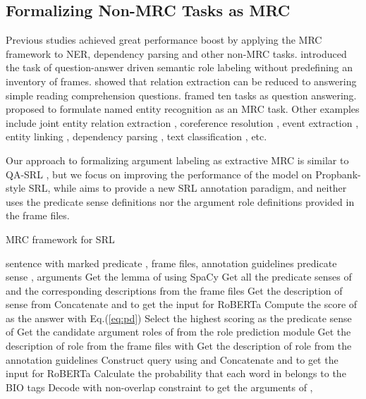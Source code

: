 \documentclass[11pt]{article}
\begin{document}
\subsection{Formalizing Non-MRC Tasks as MRC}
Previous studies achieved great performance boost by applying the MRC framework to NER, dependency parsing and other non-MRC tasks.
\citet{he2015question} introduced the task of question-answer driven semantic role labeling without predefining an inventory of frames. \citet{levy2017zero} showed that relation extraction can be reduced to answering simple reading comprehension questions. \citet{McCann2018TheNL} framed ten tasks as question answering. \citet{Li2020AUM} proposed to
formulate named entity recognition as an MRC task.  Other examples include joint entity relation extraction \cite{Li2019EntityRelationEA}, coreference resolution \cite{Wu2020CorefQACR}, event extraction \cite{Li2020EventEA},  entity linking \cite{Gu2021ReadRS}, dependency parsing \cite{gan2021dependency}, text classification \cite{chai2020description}, etc. 

Our approach to formalizing argument labeling as extractive MRC is similar to QA-SRL \cite{he2015question}, but we focus on improving the performance of the model on Propbank-style SRL, while \citet{he2015question} aims to provide a new SRL annotation paradigm, and \citet{he2015question} neither uses the predicate sense definitions nor the argument role definitions provided in the frame files.

\begin{algorithm}[!ht]
	\caption{MRC framework for SRL}
	\label{alg}
	\begin{algorithmic}[1]
        \REQUIRE sentence  with marked predicate , frame files, annotation guidelines
        \ENSURE predicate sense , arguments 
        \STATE Get the lemma  of  using SpaCy
        \STATE Get all the predicate senses  of  and the corresponding descriptions  from the frame files
            \STATE Get the description  of sense  from 
            \STATE Concatenate  and  to get the input for RoBERTa
            \STATE Compute the score of  as the answer with Eq.(\ref{eq:pd})
        \ENDFOR 
        \STATE Select the highest scoring  as the predicate sense of 
        \STATE Get the candidate argument roles  of  from the role prediction module
            \STATE Get the description  of role  from the frame files with 
            \ELSE
            \STATE Get the description  of role  from the annotation guidelines
            \ENDIF
            \STATE Construct query  using  and 
            \STATE Concatenate  and  to get the input for RoBERTa
            \STATE Calculate the probability that each word in  belongs to the BIO tags
        \ENDFOR
        \STATE Decode with non-overlap constraint to get the arguments  of 
        \RETURN , 
	\end{algorithmic}
\end{algorithm}
\end{document}
